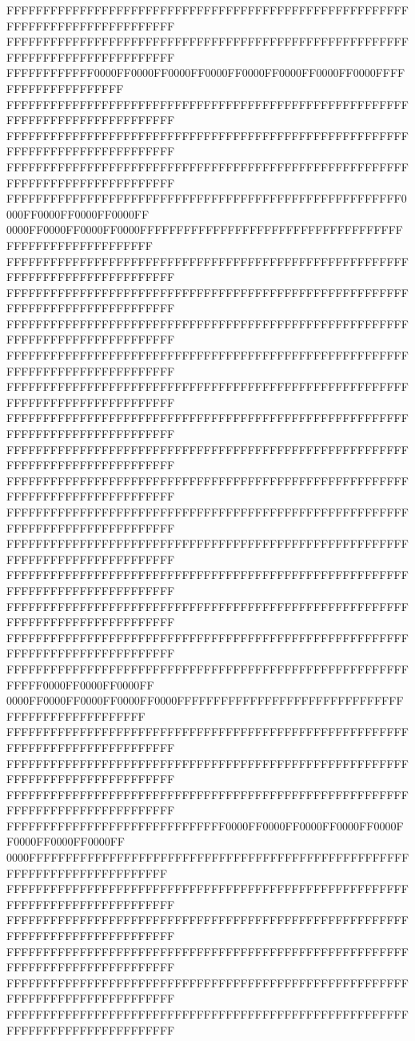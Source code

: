 FFFFFFFFFFFFFFFFFFFFFFFFFFFFFFFFFFFFFFFFFFFFFFFFFFFFFFFFFFFFFFFFFFFFFFFFFFFFFF
FFFFFFFFFFFFFFFFFFFFFFFFFFFFFFFFFFFFFFFFFFFFFFFFFFFFFFFFFFFFFFFFFFFFFFFFFFFFFF
FFFFFFFFFFFF0000FF0000FF0000FF0000FF0000FF0000FF0000FF0000FFFFFFFFFFFFFFFFFFFF
FFFFFFFFFFFFFFFFFFFFFFFFFFFFFFFFFFFFFFFFFFFFFFFFFFFFFFFFFFFFFFFFFFFFFFFFFFFFFF
FFFFFFFFFFFFFFFFFFFFFFFFFFFFFFFFFFFFFFFFFFFFFFFFFFFFFFFFFFFFFFFFFFFFFFFFFFFFFF
FFFFFFFFFFFFFFFFFFFFFFFFFFFFFFFFFFFFFFFFFFFFFFFFFFFFFFFFFFFFFFFFFFFFFFFFFFFFFF
FFFFFFFFFFFFFFFFFFFFFFFFFFFFFFFFFFFFFFFFFFFFFFFFFFFFFF0000FF0000FF0000FF0000FF
0000FF0000FF0000FF0000FFFFFFFFFFFFFFFFFFFFFFFFFFFFFFFFFFFFFFFFFFFFFFFFFFFFFFFF
FFFFFFFFFFFFFFFFFFFFFFFFFFFFFFFFFFFFFFFFFFFFFFFFFFFFFFFFFFFFFFFFFFFFFFFFFFFFFF
FFFFFFFFFFFFFFFFFFFFFFFFFFFFFFFFFFFFFFFFFFFFFFFFFFFFFFFFFFFFFFFFFFFFFFFFFFFFFF
FFFFFFFFFFFFFFFFFFFFFFFFFFFFFFFFFFFFFFFFFFFFFFFFFFFFFFFFFFFFFFFFFFFFFFFFFFFFFF
FFFFFFFFFFFFFFFFFFFFFFFFFFFFFFFFFFFFFFFFFFFFFFFFFFFFFFFFFFFFFFFFFFFFFFFFFFFFFF
FFFFFFFFFFFFFFFFFFFFFFFFFFFFFFFFFFFFFFFFFFFFFFFFFFFFFFFFFFFFFFFFFFFFFFFFFFFFFF
FFFFFFFFFFFFFFFFFFFFFFFFFFFFFFFFFFFFFFFFFFFFFFFFFFFFFFFFFFFFFFFFFFFFFFFFFFFFFF
FFFFFFFFFFFFFFFFFFFFFFFFFFFFFFFFFFFFFFFFFFFFFFFFFFFFFFFFFFFFFFFFFFFFFFFFFFFFFF
FFFFFFFFFFFFFFFFFFFFFFFFFFFFFFFFFFFFFFFFFFFFFFFFFFFFFFFFFFFFFFFFFFFFFFFFFFFFFF
FFFFFFFFFFFFFFFFFFFFFFFFFFFFFFFFFFFFFFFFFFFFFFFFFFFFFFFFFFFFFFFFFFFFFFFFFFFFFF
FFFFFFFFFFFFFFFFFFFFFFFFFFFFFFFFFFFFFFFFFFFFFFFFFFFFFFFFFFFFFFFFFFFFFFFFFFFFFF
FFFFFFFFFFFFFFFFFFFFFFFFFFFFFFFFFFFFFFFFFFFFFFFFFFFFFFFFFFFFFFFFFFFFFFFFFFFFFF
FFFFFFFFFFFFFFFFFFFFFFFFFFFFFFFFFFFFFFFFFFFFFFFFFFFFFFFFFFFFFFFFFFFFFFFFFFFFFF
FFFFFFFFFFFFFFFFFFFFFFFFFFFFFFFFFFFFFFFFFFFFFFFFFFFFFFFFFFFFFFFFFFFFFFFFFFFFFF
FFFFFFFFFFFFFFFFFFFFFFFFFFFFFFFFFFFFFFFFFFFFFFFFFFFFFFFFFFFF0000FF0000FF0000FF
0000FF0000FF0000FF0000FF0000FFFFFFFFFFFFFFFFFFFFFFFFFFFFFFFFFFFFFFFFFFFFFFFFFF
FFFFFFFFFFFFFFFFFFFFFFFFFFFFFFFFFFFFFFFFFFFFFFFFFFFFFFFFFFFFFFFFFFFFFFFFFFFFFF
FFFFFFFFFFFFFFFFFFFFFFFFFFFFFFFFFFFFFFFFFFFFFFFFFFFFFFFFFFFFFFFFFFFFFFFFFFFFFF
FFFFFFFFFFFFFFFFFFFFFFFFFFFFFFFFFFFFFFFFFFFFFFFFFFFFFFFFFFFFFFFFFFFFFFFFFFFFFF
FFFFFFFFFFFFFFFFFFFFFFFFFFFFFF0000FF0000FF0000FF0000FF0000FF0000FF0000FF0000FF
0000FFFFFFFFFFFFFFFFFFFFFFFFFFFFFFFFFFFFFFFFFFFFFFFFFFFFFFFFFFFFFFFFFFFFFFFFFF
FFFFFFFFFFFFFFFFFFFFFFFFFFFFFFFFFFFFFFFFFFFFFFFFFFFFFFFFFFFFFFFFFFFFFFFFFFFFFF
FFFFFFFFFFFFFFFFFFFFFFFFFFFFFFFFFFFFFFFFFFFFFFFFFFFFFFFFFFFFFFFFFFFFFFFFFFFFFF
FFFFFFFFFFFFFFFFFFFFFFFFFFFFFFFFFFFFFFFFFFFFFFFFFFFFFFFFFFFFFFFFFFFFFFFFFFFFFF
FFFFFFFFFFFFFFFFFFFFFFFFFFFFFFFFFFFFFFFFFFFFFFFFFFFFFFFFFFFFFFFFFFFFFFFFFFFFFF
FFFFFFFFFFFFFFFFFFFFFFFFFFFFFFFFFFFFFFFFFFFFFFFFFFFFFFFFFFFFFFFFFFFFFFFFFFFFFF
